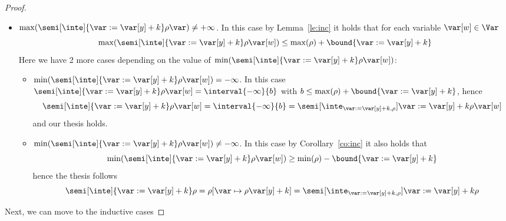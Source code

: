 \begin{proof}
\begin{itemize}
\begin{itemize}
    \end{itemize}
  \item
    \({\max(\semi[\inte]{\var := \var[y] + k}\rho\var)} \neq
    +\infty\). In this case by Lemma~\ref{le:inc} it holds that for
    each variable \(\var[w]\in\Var\)
    \begin{equation*}
      \max(\semi[\inte]{\var:= \var[y] + k}\rho\var[w]) \leq \max(\rho) + \bound{\var := \var[y] + k}
    \end{equation*}
    Here we have 2 more cases depending on the value of
    \(\min(\semi[\inte]{\var:= \var[y] + k}\rho\var[w])\):
    \begin{itemize}
    \item
      \({\min(\semi[\inte]{\var:= \var[y] + k}\rho\var[w])} =
      -\infty\). In this case
      \(\semi[\inte]{\var := \var[y] + k}\rho\var[w] =
      \interval{-\infty}{b}\) with
      \(b \leq \max(\rho) + \bound{\var := \var[y] + k}\), hence
      \begin{equation*}
        \semi[\inte]{\var := \var[y] + k}\rho\var[w] = \interval{-\infty}{b} = \semi[\inte_{\var := \var[y] + k, \rho}]{\var:=\var[y]+k}\rho\var[w]
      \end{equation*}
      and our thesis holds.
      
    \item
      \({\min(\semi[\inte]{\var:= \var[y] + k}\rho\var[w])} \neq
      -\infty\). In this case by Corollary~\ref{co:inc} it also holds
      that
      \begin{equation*}
        \min(\semi[\inte]{\var := \var[y] + k}\rho\var[w]) \geq \min(\rho) - \bound{\var := \var[y] +k} 
      \end{equation*}
      hence the thesis follows
      \begin{equation*}
        \semi[\inte]{\var := \var[y] + k}\rho = \rho[\var \mapsto \rho\var[y] + k] = \semi[\inte_{\var:=\var[y]+ k, \rho}]{\var := \var[y] + k}\rho
      \end{equation*}
    \end{itemize}
  \end{itemize}
  
  \medskip
  \noindent
  Next, we can move to the inductive cases
  
  \medskip
  

\end{proof}
